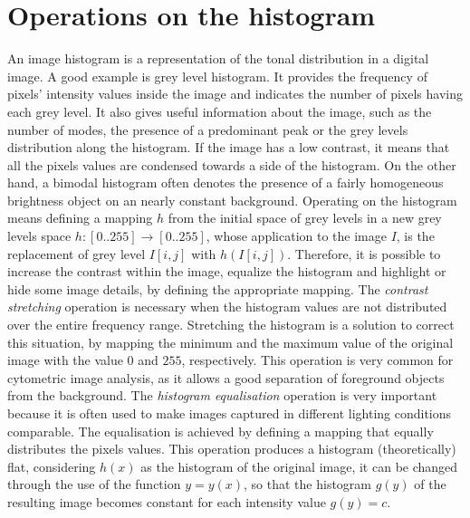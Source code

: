 \documentclass[final,a4paper,12pt,english]{UnicaPhdThesis3}
\begin{document}
\section{Operations on the histogram}\label{histop} %
An image histogram is a representation of the tonal distribution in a digital image. A good example is grey level histogram. It provides the frequency of pixels' intensity values inside the image and indicates the number of pixels having each grey level. 
It also gives useful information about the image, such as the number of modes, the presence of a predominant peak or the grey levels distribution along the histogram. If the image has a low contrast, it means that all the pixels values ​are condensed towards a side of the histogram. On the other hand, a bimodal histogram often denotes the presence of a fairly homogeneous brightness object on an nearly constant background. Operating on the histogram means defining a mapping $h$ from the initial space of grey levels in a new grey levels space $h: [0..255] \rightarrow [0..255]$, whose application to the image $I$, is the replacement of grey level $I[i, j]$ with $h(I[i, j])$. Therefore, it is possible to increase the contrast within the image, equalize the histogram and highlight or hide some image details, by defining the appropriate mapping.
The \textit{contrast stretching} operation is necessary when the histogram values are not distributed over the entire frequency range. Stretching the histogram is a solution to correct this situation, by mapping the minimum and the maximum value of the original image with the value $0$ and $255$, respectively. This operation is very common for cytometric image analysis, as it allows a good separation of foreground objects from the background.
The \textit{histogram equalisation} operation is very important because it is often used to make images captured in different lighting conditions comparable. The equalisation is achieved by defining a mapping that equally distributes the pixels values. This operation produces a histogram (theoretically) flat, considering $h(x)$ as the histogram of the original image, it can be changed through the use of the function $y = y(x)$, so that the histogram $g(y)$ of the resulting image becomes constant for each intensity value $g(y) = c$.
\end{document}

